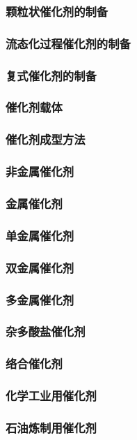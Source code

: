 \documentclass[UTF8]{../../ApplicationUniverse}
\begin{document}
        \subsubsection{颗粒状催化剂的制备}
        \subsubsection{流态化过程催化剂的制备}
        \subsubsection{复式催化剂的制备}
        \subsubsection{催化剂载体}
        \subsubsection{催化剂成型方法}
    \subsubsection{非金属催化剂}
    \subsubsection{金属催化剂}
        \subsubsection{单金属催化剂}
        \subsubsection{双金属催化剂}
        \subsubsection{多金属催化剂}
        \subsubsection{杂多酸盐催化剂}
        \subsubsection{络合催化剂}
        \subsubsection{化学工业用催化剂}
        \subsubsection{石油炼制用催化剂}
\end{document}
